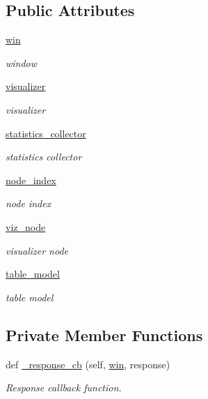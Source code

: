 \subsection*{Public Attributes}
\begin{DoxyCompactItemize}
\item 
\hyperlink{classinterface__statistics_1_1ShowInterfaceStatistics_a779a0f4e2eb460c53cff775b55b13815}{win}
\begin{DoxyCompactList}\small\item\em window \end{DoxyCompactList}\item 
\hyperlink{classinterface__statistics_1_1ShowInterfaceStatistics_a1547f0093ea7b91f54664f8ab6266b74}{visualizer}
\begin{DoxyCompactList}\small\item\em visualizer \end{DoxyCompactList}\item 
\hyperlink{classinterface__statistics_1_1ShowInterfaceStatistics_aec46892f4f5176428b1a216794387e56}{statistics\+\_\+collector}
\begin{DoxyCompactList}\small\item\em statistics collector \end{DoxyCompactList}\item 
\hyperlink{classinterface__statistics_1_1ShowInterfaceStatistics_abbc97003c4c6ed1b21f6825e6a6e46f7}{node\+\_\+index}
\begin{DoxyCompactList}\small\item\em node index \end{DoxyCompactList}\item 
\hyperlink{classinterface__statistics_1_1ShowInterfaceStatistics_a3c1117b6913c299dae47950a3d7720a6}{viz\+\_\+node}
\begin{DoxyCompactList}\small\item\em visualizer node \end{DoxyCompactList}\item 
\hyperlink{classinterface__statistics_1_1ShowInterfaceStatistics_acd0afcf7ebcf7e64428196ef5526fbe6}{table\+\_\+model}
\begin{DoxyCompactList}\small\item\em table model \end{DoxyCompactList}\end{DoxyCompactItemize}
\subsection*{Private Member Functions}
\begin{DoxyCompactItemize}
\item 
def \hyperlink{classinterface__statistics_1_1ShowInterfaceStatistics_af4b9c825841e6a28782d4f145139be80}{\+\_\+response\+\_\+cb} (self, \hyperlink{classinterface__statistics_1_1ShowInterfaceStatistics_a779a0f4e2eb460c53cff775b55b13815}{win}, response)
\begin{DoxyCompactList}\small\item\em Response callback function. \end{DoxyCompactList}\end{DoxyCompactItemize}


